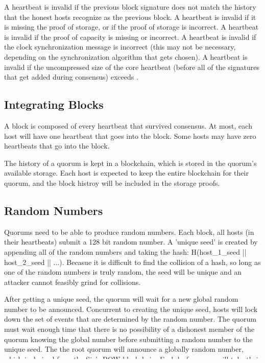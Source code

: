 \documentclass[twocolumn]{article}
\begin{document}
A heartbeat is invalid if the previous block signature does not match the history that the honest hosts recognize as the previous block.
A heartbeat is invalid if it is missing the proof of storage, or if the proof of storage is incorrect.
A heartbeat is invalid if the proof of capacity is missing or incorrect.
A heartbeat is invalid if the clock synchronization message is incorrect (this may not be necessary, depending on the synchronization algorithm that gets chosen).
A heartbeat is invalid if the uncompressed size of the core heartbeat (before all of the signatures that get added during consensus) exceeds \hbsize{}.

\subsection{Integrating Blocks}
A block is composed of every heartbeat that survived consensus.
At most, each host will have one heartbeat that goes into the block.
Some hosts may have zero heartbeats that go into the block.

The history of a quorum is kept in a blockchain, which is stored in the quorum's available storage.
Each host is expected to keep the entire blockchain for their quorum, and the block histroy will be included in the storage proofs.

\subsection{Random Numbers}
Quorums need to be able to produce random numbers.
Each block, all hosts (in their heartbeats) submit a 128 bit random number.
A 'unique seed' is created by appending all of the random numbers and taking the hash: H(host\_1\_seed || host\_2\_seed || ...).
Becasue it is difficult to find the collision of a hash, so long as one of the random numbers is truly random, the seed will be unique and an attacker cannot feasibly grind for collisions.

After getting a unique seed, the quorum will wait for a new global random number to be announced.
Concurrent to creating the unique seed, hosts will lock down the set of events that are determined by the random number.
The quorum must wait enough time that there is no possibility of a dishonest member of the quorum knowing the global number before submitting a random number to the unique seed.
The the root quorum will announce a globally random number, which is derived from the Sia's POW blockchain.
Each leaf quorum will take their unique seed, and derive a unique random number by taking H(unique\_seed || global\_random\_number).
This random number will then be applied to the events that have already been locked down.
\end{document}
